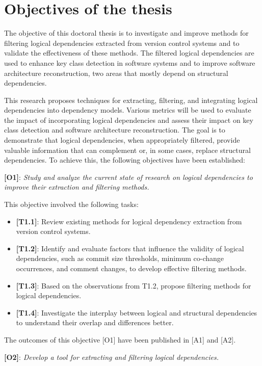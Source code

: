 \section{Objectives of the thesis}

\hspace{4em}The objective of this doctoral thesis is to investigate and improve methods for filtering logical dependencies extracted from version control systems and to validate the effectiveness of these methods. The filtered logical dependencies are used to enhance key class detection in software systems and to improve software architecture reconstruction, two areas that mostly depend on structural dependencies.

This research proposes techniques for extracting, filtering, and integrating logical dependencies into dependency models. Various metrics will be used to evaluate the impact of incorporating logical dependencies and assess their impact on key class detection and software architecture reconstruction. The goal is to demonstrate that logical dependencies, when appropriately filtered, provide valuable information that can complement or, in some cases, replace structural dependencies.
To achieve this, the following objectives have been established:

\textbf{[O1]}: \textit{Study and analyze the current state of research on logical dependencies to improve their extraction and filtering methods.}

This objective involved the following tasks:
\begin{itemize}
\item \textbf{[T1.1]}: Review existing methods for logical dependency extraction from version control systems.
\item \textbf{[T1.2]}: Identify and evaluate factors that influence the validity of logical dependencies, such as commit size thresholds, minimum co-change occurrences, and comment changes, to develop effective filtering methods.
\item \textbf{[T1.3]}: Based on the observations from T1.2, propose filtering methods for logical dependencies.
\item \textbf{[T1.4]}: Investigate the interplay between logical and structural dependencies to understand their overlap and differences better.
\end{itemize}
The outcomes of this objective [O1] have been published in [A1] and [A2].


\textbf{[O2]}: \textit{Develop a tool for extracting and filtering logical dependencies.}


